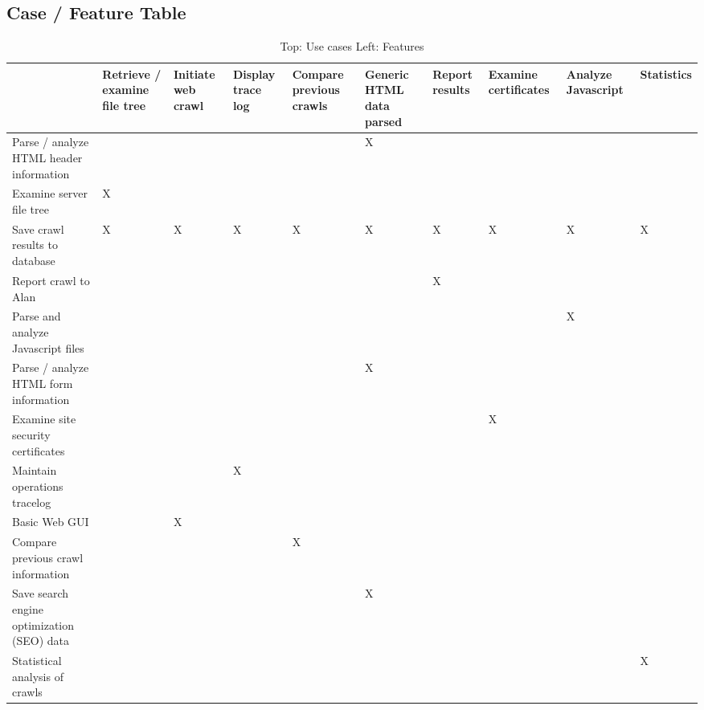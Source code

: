 \newpage

\begin{landscape}


\begin{table}
\section{Case / Feature Table }
\begin{centering}

\begin{tabular}{|p{1.5in}*{8}{|p{.65in}}|l|}
	\hline
	 & Retrieve / examine file tree & %
	Initiate web crawl & %
	Display trace log & %
	Compare previous crawls & %
	Generic HTML data parsed & %
	Report results & %
	Examine certificates & %
	Analyze Javascript & %
	Statistics \\ \hline	
	Parse / analyze HTML header information & & & & &X& & & &  \\ \hline
	Examine server file tree &X& & & & & & & &  \\ \hline
	Save crawl results to database & X&X &X &X &X&X &X &X & X  \\ \hline
	Report crawl to Alan & & & & & &X& & &  \\ \hline
	Parse and analyze Javascript files & & & & & & & &X&  \\ \hline
	Parse / analyze HTML form information & & & & & X& & & &  \\ \hline
	Examine site security certificates & & & & & & &X& &  \\ \hline
	Maintain operations tracelog & & &X& & & & & &  \\ \hline
	Basic Web GUI & &X& & & & & & &  \\ \hline
	Compare previous crawl information & & & &X& & & & &  \\ \hline
	Save search engine optimization (SEO) data & & & & &X& & & &  \\ \hline
	Statistical analysis of crawls & & & & & & & & &X \\ \hline 
\end{tabular}
\end{centering}
\caption{Top: Use cases Left: Features}
\end{table}
\end{landscape}

